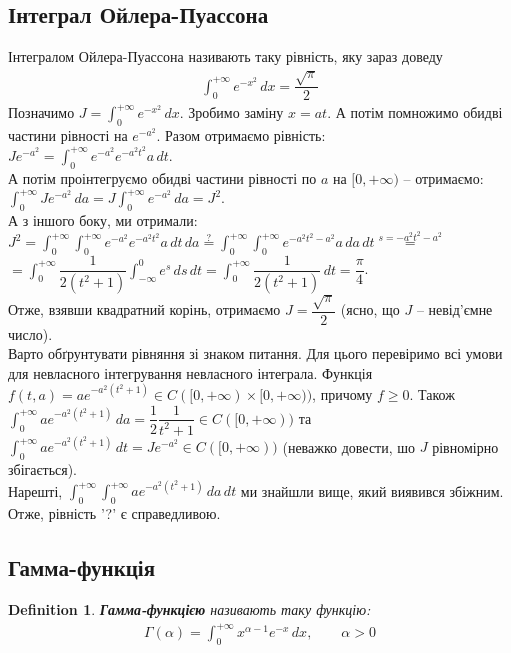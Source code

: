 \documentclass[a4paper, 10pt]{article}
\def\huge{\displaystyle}
\theoremstyle{theoremdd}
\theoremstyle{theoremdd}
\theoremstyle{theoremdd}
\newtheorem{definition}[theorem]{Definition}
\theoremstyle{theoremdd}
\theoremstyle{theoremdd}
\theoremstyle{theoremdd}
\theoremstyle{theoremdd}
\theoremstyle{theoremdd}
\theoremstyle{theoremdd}
\begin{document}
\subsection{Інтеграл Ойлера-Пуассона}
Інтегралом Ойлера-Пуассона називають таку рівність, яку зараз доведу
\begin{align*}
\int_0^{+\infty} e^{-x^2}\,dx = \dfrac{\sqrt{\pi}}{2}
\end{align*}
Позначимо $J = \huge \int_0^{+\infty} e^{-x^2}\,dx$. Зробимо заміну $x = at$. А потім помножимо обидві частини рівності на $e^{-a^2}$. Разом отримаємо рівність:\\
$Je^{-a^2} = \huge \int_0^{+\infty} e^{-a^2} e^{-a^2 t^2}a \,dt$.\\
А потім проінтегруємо обидві частини рівності по $a$ на $[0,+\infty)$ -- отримаємо:\\
$\huge\int_0^{+\infty} Je^{-a^2}\,da = J \int_0^{+\infty} e^{-a^2}\,da = J^2$.\\
А з іншого боку, ми отримали:\\
$J^2 = \huge\int_0^{+\infty} \huge\int_0^{+\infty} e^{-a^2} e^{-a^2t^2} a\,dt \,da \overset{?}{=} \int_0^{+\infty} \int_0^{+\infty} e^{-a^2t^2-a^2} a\,da \,dt \overset{s =-a^2t^2-a^2}{=}$\\
$= \huge \int_0^{+\infty} \dfrac{1}{2(t^2+1)} \int_{-\infty}^0 e^s\,ds\,dt = \int_0^{+\infty} \dfrac{1}{2(t^2+1)}\,dt = \dfrac{\pi}{4}$.\\
Отже, взявши квадратний корінь, отримаємо $J = \dfrac{\sqrt{\pi}}{2}$ (ясно, що $J$ -- невід'ємне число).\\
Варто обґрунтувати рівняння зі знаком питання. Для цього перевіримо всі умови для невласного інтегрування невласного інтеграла. Функція $f(t,a) = ae^{-a^2(t^2+1)} \in C([0,+\infty) \times [0,+\infty))$, причому $f \geq 0$. Також \\
$\huge\int_0^{+\infty} ae^{-a^2(t^2+1)}\,da = \dfrac{1}{2} \dfrac{1}{t^2+1} \in C([0,+\infty))$ та $\huge\int_0^{+\infty} ae^{-a^2(t^2+1)}\,dt = Je^{-a^2} \in C([0,+\infty))$ (неважко довести, шо $J$ рівномірно збігається).\\
Нарешті, $\huge\int_0^{+\infty} \int_0^{+\infty} ae^{-a^2(t^2+1)}\,da\,dt$ ми знайшли вище, який виявився збіжним. Отже, рівність '?' є справедливою.

\subsection{Гамма-функція}
\begin{definition}
\textbf{Гамма-функцією} називають таку функцію:
\begin{align*}
\Gamma(\alpha) = \huge \int_0^{+\infty} x^{\alpha-1}e^{-x}\,dx,\qquad \alpha > 0
\end{align*}
\end{definition}
\end{document}
